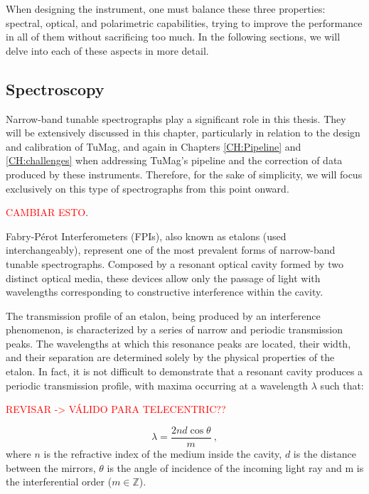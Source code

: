 When designing the instrument, one must balance these three properties: spectral, optical, and polarimetric capabilities, trying to improve the performance in all of them without sacrificing too much. In the following sections, we will delve into each of these aspects in more detail.

\subsection{Spectroscopy}

Narrow-band tunable spectrographs play a significant role in this thesis. They will be extensively discussed in this chapter, particularly in relation to the design and calibration of TuMag, and again in Chapters \ref{CH:Pipeline} and \ref{CH:challenges} when addressing TuMag's pipeline and the correction of data produced by these instruments. Therefore, for the sake of simplicity, we will focus exclusively on this type of spectrographs from this point onward.

\textcolor{red}{CAMBIAR ESTO}.

Fabry-Pérot Interferometers (FPIs), also known as etalons (used interchangeably), represent one of the most prevalent forms of narrow-band tunable spectrographs. Composed by a resonant optical cavity formed by two distinct optical media, these devices allow only the passage of light with wavelengths corresponding to constructive interference within the cavity. 

The transmission profile of an etalon, being produced by an interference phenomenon, is characterized by a series of narrow and periodic transmission peaks. The wavelengths at which this resonance peaks are located, their width, and their separation are determined solely by the physical properties of the etalon. In fact, it is not difficult to demonstrate \citep{franI} that a resonant cavity produces a periodic transmission profile, with maxima occurring at a wavelength $\lambda$ such that:

\textcolor{red}{REVISAR -> VÁLIDO PARA TELECENTRIC??} 

\begin{equation}
\lambda = \frac{2nd\cos \theta}{m}\ ,
\label{eq_ch2: order_sorting}
\end{equation}
where $n$ is the refractive index of the medium inside the cavity, $d$ is the distance between the mirrors, $\theta$ is the angle of incidence of the incoming light ray and m is the interferential order ($m \in \mathbb{Z} $). 

